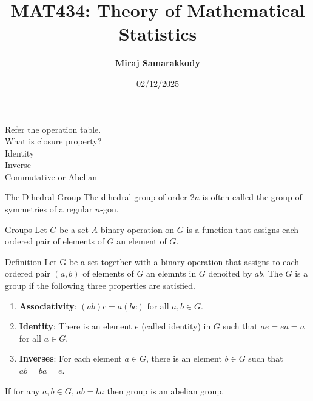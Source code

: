 \documentclass{beamer}
\title{MAT434: Theory of Mathematical Statistics}
\author{\textbf{Miraj Samarakkody}}
\institute{Tougaloo College}
\date{02/12/2025}
\begin{document}
\begin{frame}
    \titlepage
\end{frame}

\begin{frame}
    Refer the operation table. \\ \pause
    What is closure property? \\ \pause
    Identity\\ \pause
    Inverse\\ \pause
    Commutative or Abelian

\end{frame}

\begin{frame}
    \begin{block}{The Dihedral Group}
        The dihedral group of order \(2n\) is often called the group of symmetries of a regular \(
        n\)-gon. 
    \end{block}
\end{frame}

\begin{frame}{Groups}
    Let \(G\) be a set \(A\) binary operation on \(G\) is a function that assigns each ordered pair of elements of \(G\) an element of \(G\). \pause

    \begin{block}{Definition}
        Let G be a set together with a binary operation that assigns to each ordered pair \((a,b)\) of elements of \(G\) an elemnts in \(G\) denoited by \(ab\). The \(G\) is a group if the following three properties are satisfied. \pause
        \begin{enumerate}
            \item \textbf{Associativity}: \((ab) c= a (bc)\) for all \(a,b \in G\).
            \item \textbf{Identity}: There is an element \(e\) (called identity) in \(G\) such that \(ae=ea=a\) for all \(a \in G\).
            \item \textbf{Inverses}: For each element \(a \in G\), there is an element \(b\in G\) such that \(ab=ba=e\).
        \end{enumerate}
        If for any \(a,b \in G\), \(ab=ba\) then group is an abelian group. 
    \end{block}
\end{frame}
\end{document}
